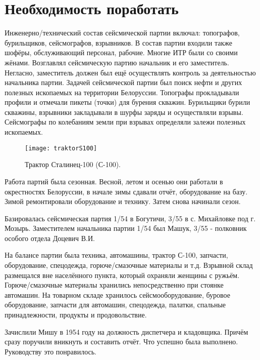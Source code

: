 ﻿\chapter{Необходимость поработать}

Инженерно\-/технический состав сейсмической партии включал: топографов, бурильщиков, сейсмографов, взрывников. В состав партии входили также шофёры, обслуживающий персонал, рабочие. Многие ИТР были со своими жёнами. Возглавлял сейсмическую партию начальник и его заместитель. Негласно, заместитель должен был ещё осуществлять контроль за деятельностью начальника партии. Задачей сейсмической партии был поиск нефти и других полезных ископаемых на территории Белоруссии. Топографы прокладывали профили и отмечали пикеты (точки) для бурения скважин. Бурильщики бурили скважины, взрывники закладывали в шурфы заряды и осуществляли взрывы. Сейсмографы по колебаниям земли при взрывах определяли залежи полезных ископаемых.

\begin{wrapfigure}{O}{.4\textwidth}
\centering
\texttt{[image: traktorS100]}
\caption[Трактор Сталинец-100 (С-100).]{Трактор Сталинец-100 (С-100)\footnotemark.}
\label{fig:traktorS100}
\end{wrapfigure}

Работа партий была сезонная. Весной, летом и осенью они работали в окрестностях Белоруссии, в начале зимы сдавали отчёт, оборудование на базу. Зимой ремонтировали оборудование и технику. Затем снова начинали сезон.

Базировалась сейсмическая партия 1/54 в Богутичи, 3/55 в с. Михайловке под г. Мозырь. Заместителем начальника партии 1/54 был Машук, 3/55 - полковник особого отдела Доцевич В.И.

На балансе партии была техника, автомашины, трактор С-100, запчасти, оборудование, спецодежда, горюче\-/смазочные материалы и т.д. Взрывной склад размещался вне населённого пункта, который охраняли женщины с ружьём. Горюче\-/смазочные материалы хранились непосредственно при стоянке автомашин. На товарном складе хранилось сейсмооборудование, буровое оборудование, запчасти для автомашин, спецодежда, палатки, спальные принадлежности, продукты и продовольствие.

Зачислили Мишу в 1954 году на должность диспетчера и кладовщика. Причём сразу поручили вникнуть и составить отчёт. Что успешно была выполнено. Руководству это понравилось.

